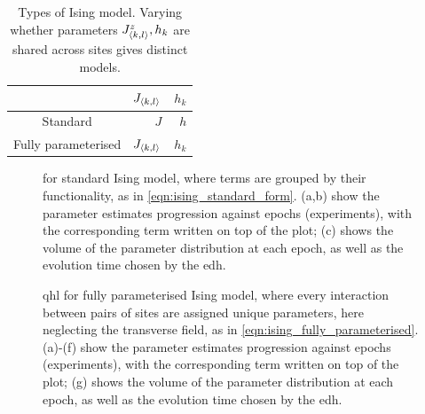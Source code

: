 \begin{table}[H]
    \begin{center}
        \begin{tabular}{crr}
             & $J_{{ \langle k, l \rangle }}$  & $h_{k}$ \\
            \hline
            Standard & $J$ & $h$ \\
            Fully parameterised & $J_{{ \langle k, l \rangle }}$ & $h_{k}$
        \end{tabular}
    \end{center}
    \caption[Types of Ising model]{Types of Ising model. Varying whether parameters $J^{z}_{{ \langle k, l \rangle }}, h_k$ are shared 
        across sites gives distinct models. 
    }
    \label{table:ising_models}
\end{table}

\par 

\begin{figure}
    \begin{center}
    \end{center}

    \caption[ for standard Ising model]{
         for standard Ising model, where terms are grouped by their functionality, 
        as in \cref{eqn:ising_standard_form}. 
        (a,b) show the parameter estimates progression against 
        epochs (experiments), with the corresponding term written on top of the plot; 
        (c) shows the \gls{volume} of the parameter distribution at each epoch, as well as the 
        evolution time chosen by the \gls{edh}. 
        \figtableref
    }
    \label{fig:ising_two_param_learning}
\end{figure}

\begin{figure}
    \begin{center}
    \end{center}
    \caption[ for fully parameterised Ising model]{
        \gls{qhl} for fully parameterised Ising model, 
            where every interaction between pairs of sites are assigned unique parameters, 
            here neglecting the transverse field, 
            as in \cref{eqn:ising_fully_parameterised}. 
        (a)-(f) show the parameter estimates progression against 
        epochs (experiments), with the corresponding term written on top of the plot; 
        (g) shows the \gls{volume} of the parameter distribution at each epoch, as well as the 
        evolution time chosen by the \gls{edh}. 
        \figtableref
    }
    \label{fig:ising_fully_parameterised}
\end{figure}

